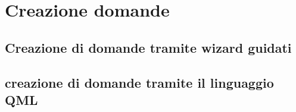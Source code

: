 \newpage
\section{Creazione domande}
\subsection{Creazione di domande tramite wizard guidati}
\subsection{creazione di domande tramite il linguaggio QML}